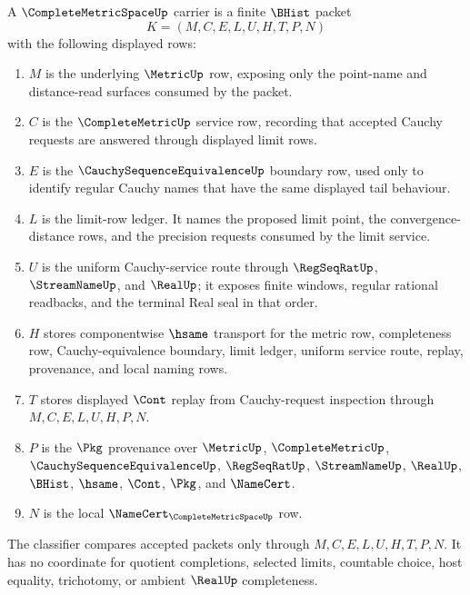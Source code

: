 \begin{definition}
\label{def:complete-metric-space-carrier}
A $\CompleteMetricSpaceUp$ carrier is a finite $\BHist$ packet
$$
K=(M,C,E,L,U,H,T,P,N)
$$
with the following displayed rows:
\begin{enumerate}
\item $M$ is the underlying $\MetricUp$ row, exposing only the point-name and distance-read surfaces consumed by the packet.
\item $C$ is the $\CompleteMetricUp$ service row, recording that accepted Cauchy requests are answered through displayed limit rows.
\item $E$ is the $\CauchySequenceEquivalenceUp$ boundary row, used only to identify regular Cauchy names that have the same displayed tail behaviour.
\item $L$ is the limit-row ledger. It names the proposed limit point, the convergence-distance rows, and the precision requests consumed by the limit service.
\item $U$ is the uniform Cauchy-service route through $\RegSeqRatUp$, $\StreamNameUp$, and $\RealUp$; it exposes finite windows, regular rational readbacks, and the terminal Real seal in that order.
\item $H$ stores componentwise $\hsame$ transport for the metric row, completeness row, Cauchy-equivalence boundary, limit ledger, uniform service route, replay, provenance, and local naming rows.
\item $T$ stores displayed $\Cont$ replay from Cauchy-request inspection through $M,C,E,L,U,H,P,N$.
\item $P$ is the $\Pkg$ provenance over $\MetricUp$, $\CompleteMetricUp$, $\CauchySequenceEquivalenceUp$, $\RegSeqRatUp$, $\StreamNameUp$, $\RealUp$, $\BHist$, $\hsame$, $\Cont$, $\Pkg$, and $\NameCert$.
\item $N$ is the local $\NameCert_{\CompleteMetricSpaceUp}$ row.
\end{enumerate}
The classifier compares accepted packets only through $M,C,E,L,U,H,T,P,N$. It has no coordinate for quotient completions, selected limits, countable choice, host equality, trichotomy, or ambient $\RealUp$ completeness.
\end{definition}

